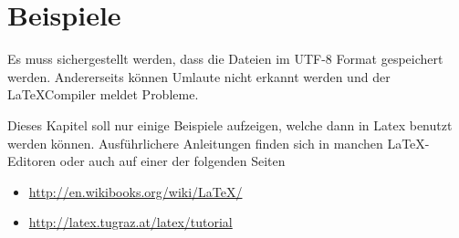 \chapter{Beispiele}

Es muss sichergestellt werden, dass die Dateien im UTF-8 Format gespeichert werden. Andererseits können Umlaute nicht erkannt werden und der \LaTeX Compiler meldet Probleme.

Dieses Kapitel soll nur einige Beispiele aufzeigen, welche dann in Latex benutzt werden können. Ausführlichere Anleitungen finden sich in manchen \LaTeX-Editoren oder auch auf einer der folgenden Seiten

\begin{itemize}
	\item \url{http://en.wikibooks.org/wiki/LaTeX/}
	\item \url{http://latex.tugraz.at/latex/tutorial}
\end{itemize}